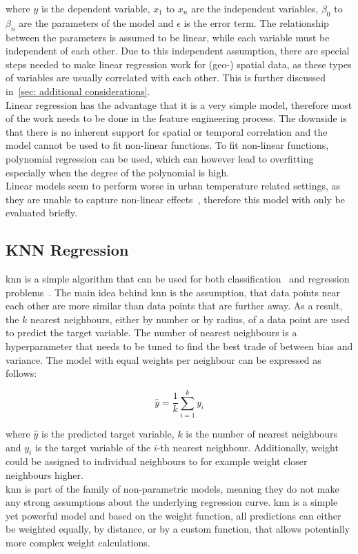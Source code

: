 where $y$ is the dependent variable, $x_1$ to $x_n$ are the independent variables, $\beta_0$ to $\beta_n$ are the parameters of the model and $\epsilon$ is the error term. The relationship between the parameters is assumed to be linear, while each variable must be independent of each other. Due to this independent assumption, there are special steps needed to make linear regression work for (geo-) spatial data, as these types of variables are usually correlated with each other. This is further discussed in~\ref{sec: additional considerations}.\\
Linear regression has the advantage that it is a very simple model, therefore most of the work needs to be done in the feature engineering process. The downside is that there is no inherent support for spatial or temporal correlation and the model cannot be used to fit non-linear functions. To fit non-linear functions, polynomial regression can be used, which can however lead to overfitting especially when the degree of the polynomial is high.\\
Linear models seem to perform worse in urban temperature related settings, as they are unable to capture non-linear effects~\cite{voelkel2017towards}, therefore this model with only be evaluated briefly.

\subsection{KNN Regression}

\gls{knn} is a simple algorithm that can be used for both classification~\cite{cover1967nearest} and regression problems~\cite{altman1992introduction}. The main idea behind \gls{knn} is the assumption, that data points near each other are more similar than data points that are further away. As a result, the $k$ nearest neighbours, either by number or by radius, of a data point are used to predict the target variable. The number of nearest neighbours is a hyperparameter that needs to be tuned to find the best trade of between bias and variance. The model with equal weights per neighbour can be expressed as follows:

\begin{equation}
    \hat{y} = \frac{1}{k} \sum_{i=1}^{k} y_i
\end{equation}

where $\hat{y}$ is the predicted target variable, $k$ is the number of nearest neighbours and $y_i$ is the target variable of the $i$-th nearest neighbour. Additionally, weight could be assigned to individual neighbours to for example weight closer neighbours higher.\\
\gls{knn} is part of the family of non-parametric models, meaning they do not make any strong assumptions about the underlying regression curve. \gls{knn} is a simple yet powerful model and based on the weight function, all predictions can either be weighted equally, by distance, or by a custom function, that allows potentially more complex weight calculations.

